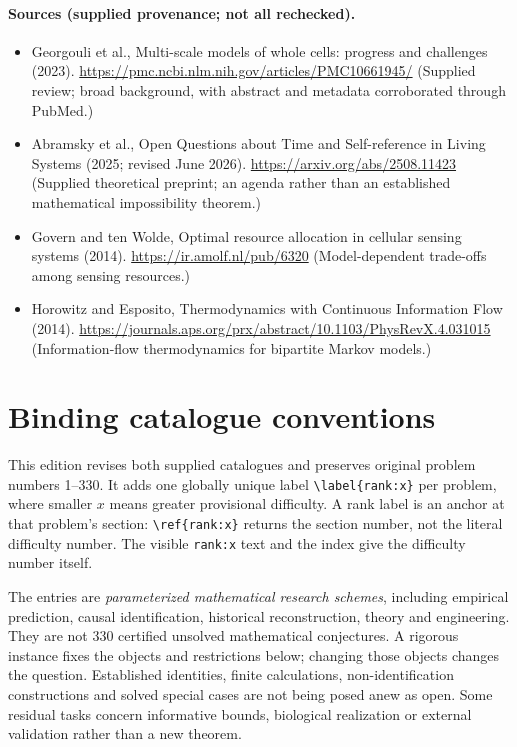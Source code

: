 \documentclass[11pt]{article}
\begin{document}
\paragraph{Sources (supplied provenance; not all rechecked).}
\begin{itemize}
\item Georgouli et al., Multi-scale models of whole cells: progress and challenges (2023). \url{https://pmc.ncbi.nlm.nih.gov/articles/PMC10661945/} (Supplied review; broad background, with abstract and metadata corroborated through PubMed.)
\item Abramsky et al., Open Questions about Time and Self-reference in Living Systems (2025; revised June 2026). \url{https://arxiv.org/abs/2508.11423} (Supplied theoretical preprint; an agenda rather than an established mathematical impossibility theorem.)
\item Govern and ten Wolde, Optimal resource allocation in cellular sensing systems (2014). \url{https://ir.amolf.nl/pub/6320} (Model-dependent trade-offs among sensing resources.)
\item Horowitz and Esposito, Thermodynamics with Continuous Information Flow (2014). \url{https://journals.aps.org/prx/abstract/10.1103/PhysRevX.4.031015} (Information-flow thermodynamics for bipartite Markov models.)
\end{itemize}


\section*{Binding catalogue conventions}
This edition revises both supplied catalogues and preserves original problem numbers 1--330. It adds one globally unique label \verb|\label{rank:x}| per problem, where smaller $x$ means greater provisional difficulty. A rank label is an anchor at that problem's section: \verb|\ref{rank:x}| returns the section number, not the literal difficulty number. The visible \texttt{rank:x} text and the index give the difficulty number itself.

The entries are \emph{parameterized mathematical research schemes}, including empirical prediction, causal identification, historical reconstruction, theory and engineering. They are not 330 certified unsolved mathematical conjectures. A rigorous instance fixes the objects and restrictions below; changing those objects changes the question. Established identities, finite calculations, non-identification constructions and solved special cases are not being posed anew as open. Some residual tasks concern informative bounds, biological realization or external validation rather than a new theorem.
\end{document}
